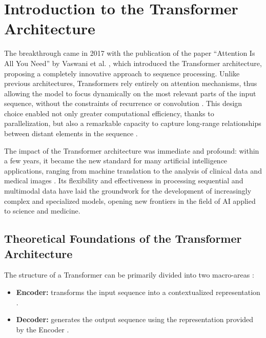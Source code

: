 \section{Introduction to the Transformer Architecture}
\label{chap:introduzione}

\label{sub:avvento_transformers}
\noindent
The breakthrough came in 2017 with the publication of the paper ``Attention Is All You Need'' by Vaswani et al. \cite{arxiv-attention}, which introduced the Transformer architecture, proposing a completely innovative approach to sequence processing. Unlike previous architectures, Transformers rely entirely on attention mechanisms, thus allowing the model to focus dynamically on the most relevant parts of the input sequence, without the constraints of recurrence or convolution \cite{arxiv-attention, stanford}. This design choice enabled not only greater computational efficiency, thanks to parallelization, but also a remarkable capacity to capture long-range relationships between distant elements in the sequence \cite{arxiv-attention, GeeksForGeeks}.

The impact of the Transformer architecture was immediate and profound: within a few years, it became the new standard for many artificial intelligence applications, ranging from machine translation to the analysis of clinical data and medical images \cite{arxiv-attention, arxiv-skipconnection-survey}. Its flexibility and effectiveness in processing sequential and multimodal data have laid the groundwork for the development of increasingly complex and specialized models, opening new frontiers in the field of AI applied to science and medicine.

\subsection{Theoretical Foundations of the Transformer Architecture}
\label{sec:fondamenti_transformers}
\noindent
The structure of a Transformer can be primarily divided into two macro-areas \cite{arxiv-attention, git-hub}: 
\begin{itemize}
\item \textbf{Encoder:} transforms the input sequence into a contextualized representation \cite{stanford}.
\item \textbf{Decoder:} generates the output sequence using the representation provided by the Encoder \cite{arxiv-attention, stanford}.
\end{itemize}


